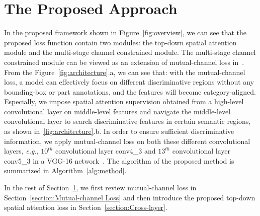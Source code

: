 \documentclass[journal]{IEEEtran}
\begin{document}
\section{The Proposed Approach}\label{section:Approach}
In the proposed framework shown in Figure~\ref{fig:overview}, we can see that the proposed loss function contain two modules: the top-down spatial attention module and the multi-stage channel constrained module. The multi-stage channel constrained module can be viewed as an extension of mutual-channel loss in~\cite{chang2020mc}. 
From the Figure~\ref{fig:architecture}.a, we can see that: with the mutual-channel loss, a model can effectively focus on different discriminative regions without any bounding-box or part annotations, and the features will become category-aligned. 
Especially, we impose spatial attention supervision obtained from a high-level convolutional layer on middle-level features and navigate the middle-level convolutional layer to search discriminative features in certain semantic regions, as shown in~\ref{fig:architecture}.b. In order to ensure sufficient discriminative information, we apply mutual-channel loss on both these different convolutional layers, \emph{e.g.}, $10^{th}$ convolutional layer conv4\_3 and $13^{th}$ convolutional layer conv5\_3 in a VGG-16 network~\cite{simonyan2014very}. The algorithm of the proposed method is summarized in Algorithm~\ref{alg:method}.



In the rest of Section~\ref{section:Approach}, we first review mutual-channel loss in Section~\ref{section:Mutual-channel Loss} and then introduce the proposed top-down spatial attention loss in Section~\ref{section:Cross-layer}. 
\end{document}
